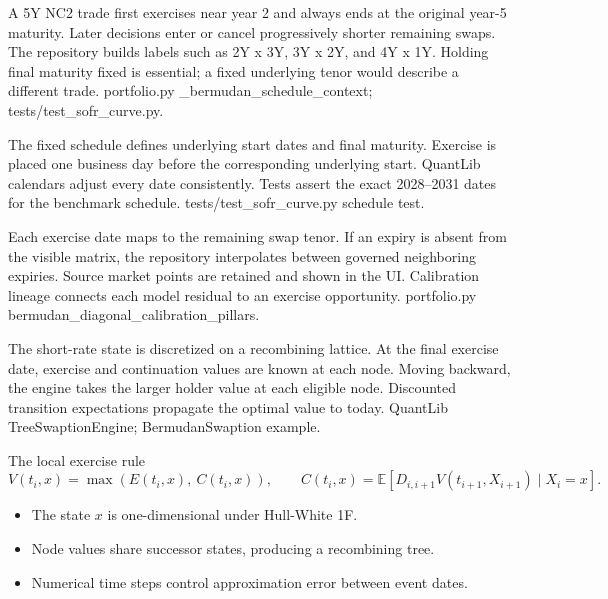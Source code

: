 {A 5Y NC2 trade first exercises near year 2 and always ends at the original year-5 maturity.}
{Later decisions enter or cancel progressively shorter remaining swaps.}
{The repository builds labels such as 2Y x 3Y, 3Y x 2Y, and 4Y x 1Y.}
{Holding final maturity fixed is essential; a fixed underlying tenor would describe a different trade.}
{portfolio.py \_bermudan\_schedule\_context; tests/test\_sofr\_curve.py.}

{The fixed schedule defines underlying start dates and final maturity.}
{Exercise is placed one business day before the corresponding underlying start.}
{QuantLib calendars adjust every date consistently.}
{Tests assert the exact 2028--2031 dates for the benchmark schedule.}
{tests/test\_sofr\_curve.py schedule test.}

{Each exercise date maps to the remaining swap tenor.}
{If an expiry is absent from the visible matrix, the repository interpolates between governed neighboring expiries.}
{Source market points are retained and shown in the UI.}
{Calibration lineage connects each model residual to an exercise opportunity.}
{portfolio.py bermudan\_diagonal\_calibration\_pillars.}

{The short-rate state is discretized on a recombining lattice.}
{At the final exercise date, exercise and continuation values are known at each node.}
{Moving backward, the engine takes the larger holder value at each eligible node.}
{Discounted transition expectations propagate the optimal value to today.}
{QuantLib TreeSwaptionEngine; BermudanSwaption example.}

\begin{frame}{The local exercise rule}
  \[
    V(t_i,x)=\max\left(E(t_i,x),\ C(t_i,x)\right),
    \qquad
    C(t_i,x)=\mathbb E\!\left[D_{i,i+1}V(t_{i+1},X_{i+1})\mid X_i=x\right].
  \]
  \begin{itemize}\setlength\itemsep{0.8em}
    \item The state $x$ is one-dimensional under Hull-White 1F.
    \item Node values share successor states, producing a recombining tree.
    \item Numerical time steps control approximation error between event dates.
  \end{itemize}
\end{frame}

